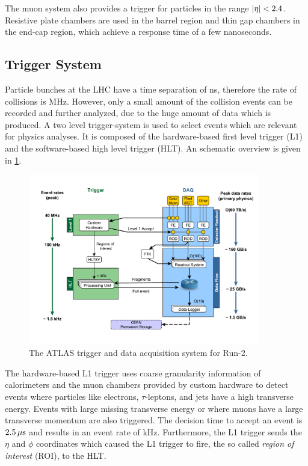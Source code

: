 The muon system also provides a trigger for particles in the range $\left|\eta\right| < 2.4$.
Resistive plate chambers are used in the barrel region and thin gap chambers in the end-cap region, which
achieve a response time of a few nanoseconds.

\subsection{Trigger System}\label{sub:setup:trigger}

Particle bunches at the LHC have a time separation of \unit[25]{ns}, therefore the rate of collisions is \unit[40]{MHz}.
However, only a small amount of the collision events can be recorded and further analyzed, due to the huge amount of data which is produced.
A two level trigger-system is used to select events which are relevant for physics analyses.
It is composed of the hardware-based first level trigger (L1) and the software-based high level trigger (HLT).
An schematic overview is given in \cref{fig:setup:trigger}.

\begin{figure}[htb]
    \centering
    \includegraphics[width=0.9\textwidth]{./figures/setup/trigger.pdf}
    \caption{The ATLAS trigger and data acquisition system for Run-2.\cite{ImageTrigger}}\label{fig:setup:trigger}
\end{figure}

The hardware-based L1 trigger uses coarse granularity information of calorimeters and the muon chambers provided by custom hardware
to detect events where particles like electrons, $\tau$-leptons, and jets have a high transverse energy.
Events with large missing transverse energy or where muons have a large transverse momentum are also triggered.
The decision time to accept an event is $\unit[2.5]{\mu s}$ and results in an event rate of \unit[100]{kHz}.
Furthermore, the L1 trigger sends the $\eta$ and $\phi$ coordinates which caused the L1 trigger to fire,
the so called \emph{region of interest} (ROI), to the HLT\@.

